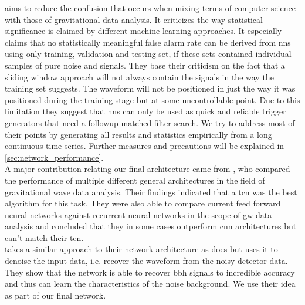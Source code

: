 \cite{cnn_magiacal_bullet} aims to reduce the confusion that occurs when mixing terms of computer science with those of gravitational data analysis. It criticizes the way statistical significance is claimed by different machine learning approaches. It especially claims that no statistically meaningful false alarm rate can be derived from \gls{nn}s using only training, validation and testing set, if these sets contained individual samples of pure noise and signals. They base their criticism on the fact that a sliding window approach will not always contain the signals in the way the training set suggests. The waveform will not be positioned in just the way it was positioned during the training stage but at some uncontrollable point. Due to this limitation they suggest that \gls{nn}s can only be used as quick and reliable trigger generators that need a followup matched filter search. We try to address most of their points by generating all results and statistics empirically from a long continuous time series. Further measures and precautions will be explained in \autoref{sec:network_performance}.\\
A major contribution relating our final architecture came from \cite{tcn_idea}, who compared the performance of multiple different general architectures in the field of gravitational wave data analysis. Their findings indicated that a \gls{tcn} was the best algorithm for this task. They were also able to compare current feed forward neural networks against recurrent neural networks in the scope of \gls{gw} data analysis and concluded that they in some cases outperform \gls{cnn} architectures but can't match their \gls{tcn}.\\
\cite{dnn_denoising} takes a similar approach to their network architecture as \cite{tcn_idea} does but uses it to denoise the input data, i.e. recover the waveform from the noisy detector data. They show that the network is able to recover \gls{bbh} signals to incredible accuracy and thus can learn the characteristics of the noise background. We use their idea as part of our final network.